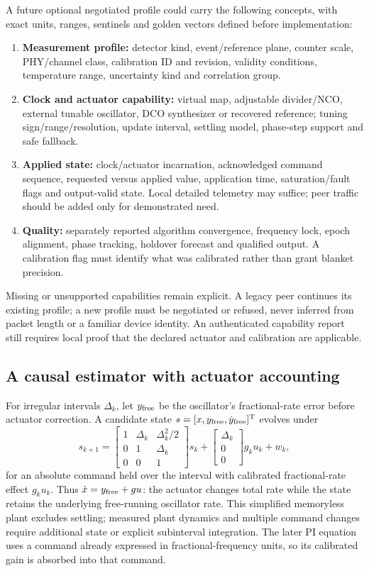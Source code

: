 \documentclass[11pt,letterpaper]{article}
\begin{document}
A future optional negotiated profile could carry the following concepts, with exact units, ranges, sentinels and golden vectors defined before implementation:
\begin{enumerate}
\item \textbf{Measurement profile:} detector kind, event/reference plane, counter scale, PHY/channel class, calibration ID and revision, validity conditions, temperature range, uncertainty kind and correlation group.
\item \textbf{Clock and actuator capability:} virtual map, adjustable divider/NCO, external tunable oscillator, DCO synthesizer or recovered reference; tuning sign/range/resolution, update interval, settling model, phase-step support and safe fallback.
\item \textbf{Applied state:} clock/actuator incarnation, acknowledged command sequence, requested versus applied value, application time, saturation/fault flags and output-valid state. Local detailed telemetry may suffice; peer traffic should be added only for demonstrated need.
\item \textbf{Quality:} separately reported algorithm convergence, frequency lock, epoch alignment, phase tracking, holdover forecast and qualified output. A calibration flag must identify what was calibrated rather than grant blanket precision.
\end{enumerate}
Missing or unsupported capabilities remain explicit. A legacy peer continues its existing profile; a new profile must be negotiated or refused, never inferred from packet length or a familiar device identity. An authenticated capability report still requires local proof that the declared actuator and calibration are applicable.

\subsection{A causal estimator with actuator accounting}
For irregular intervals $\Delta_k$, let $y_{\rm free}$ be the oscillator's fractional-rate error before actuator correction. A candidate state $s=[x,y_{\rm free},\dot y_{\rm free}]^\mathrm T$ evolves under
\begin{equation}
s_{k+1}=\begin{bmatrix}1&\Delta_k&\Delta_k^2/2\\0&1&\Delta_k\\0&0&1\end{bmatrix}s_k+
\begin{bmatrix}\Delta_k\\0\\0\end{bmatrix}g_k u_k+w_k,
\label{eq:plant}
\end{equation}
for an absolute command held over the interval with calibrated fractional-rate effect $g_ku_k$. Thus $\dot x=y_{\rm free}+gu$: the actuator changes total rate while the state retains the underlying free-running oscillator rate. This simplified memoryless plant excludes settling; measured plant dynamics and multiple command changes require additional state or explicit subinterval integration. The later PI equation uses a command already expressed in fractional-frequency units, so its calibrated gain is absorbed into that command.
\end{document}
